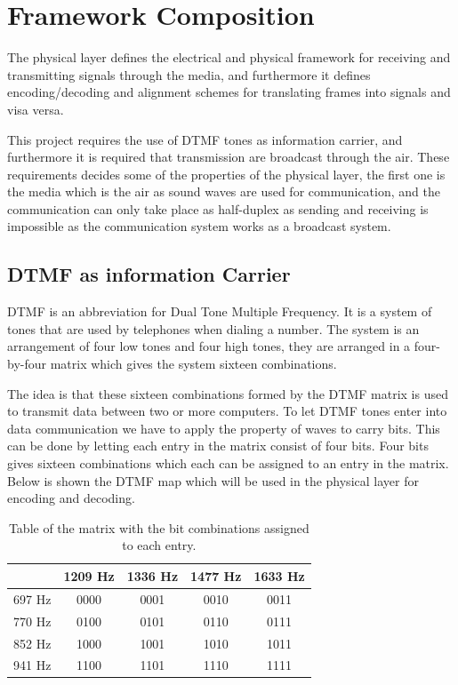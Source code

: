 \section{Framework Composition}\label{sec:physical_analysis} 
The physical layer defines the electrical and physical framework for receiving and 
transmitting signals through the media, and furthermore it defines encoding/decoding 
and alignment schemes for translating frames into signals and visa versa.

This project requires the use of DTMF tones as information carrier, and furthermore it is
required that transmission are broadcast through the air. These requirements decides some
of the properties of the physical layer, the first one is the media which is the air as 
sound waves are used for communication, and the communication can only take place as half-duplex as sending and receiving is impossible as the communication system works as a broadcast system.


	\subsection{DTMF as information Carrier}
	DTMF is an abbreviation for Dual Tone Multiple Frequency. It is a system of tones that are used by
	telephones when dialing a number. The system is an arrangement of four low tones and four high tones,
	they are arranged in a four-by-four matrix which gives the system sixteen combinations.
	
	The idea is that these sixteen combinations formed by the DTMF matrix is used to transmit data
	between two or more computers. To let DTMF tones enter into data communication we have
	to apply the property of  waves to carry bits. This can be done by letting each entry in the matrix
	consist of four bits. Four bits gives sixteen combinations which each can be assigned to an entry in
	the matrix. Below is shown the DTMF map which will be used in the physical layer for encoding and decoding.
	
	\begin{table}[!h]
		\begin{center}
			\begin{tabular}{c|c c c c}
			 & 1209 Hz & 1336 Hz & 1477 Hz & 1633 Hz \\
			\hline
			697 Hz & 0000 & 0001 & 0010 & 0011 \\
			770 Hz & 0100 & 0101 & 0110 & 0111 \\
			852 Hz & 1000 & 1001 & 1010 & 1011 \\
			941 Hz & 1100 & 1101 & 1110 & 1111 \\
			\end{tabular}
		\end{center}
		\caption{Table of the matrix with the bit combinations assigned to each entry.}
		\label{tab:DTMF_mapping}
	\end{table}
	
